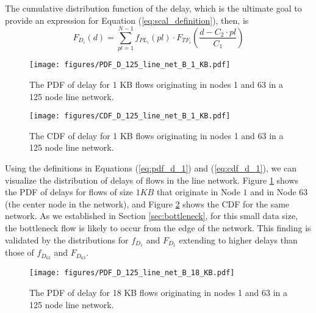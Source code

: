 The cumulative distribution function of the delay, which is the ultimate goal to provide an expression for Equation (\ref{eq:scal_definition}), then, is
\begin{equation}
	F_{D_i}(d) = \sum\limits_{pl=1}^{N-1} f_{PL_i}(pl) \cdot F_{TF_i}(\frac{d - C_2 \cdot pl}{C_1})
	\label{eq:cdf_d_1}
\end{equation}

\begin{figure}
\begin{centering}
    \texttt{[image: figures/PDF\_D\_125\_line\_net\_B\_1\_KB.pdf]}
    \caption{The PDF of delay for 1 KB flows originating in nodes 1 and 63 in a 125 node line network.}
    \label{fig:pdf_d_125_line_net_B_1_KB}
\end{centering}
\end{figure}

\begin{figure}
\begin{centering}
    \texttt{[image: figures/CDF\_D\_125\_line\_net\_B\_1\_KB.pdf]}
    \caption{The CDF of delay for 1 KB flows originating in nodes 1 and 63 in a 125 node line network.}
    \label{fig:cdf_d_125_line_net_B_1_KB}
\end{centering}
\end{figure}

Using the definitions in Equations (\ref{eq:pdf_d_1}) and (\ref{eq:cdf_d_1}), we can visualize the distribution of delays of flows in the line network.  Figure \ref{fig:pdf_d_125_line_net_B_1_KB} shows the PDF of delays for flows of size $1 KB$ that originate in Node $1$ and in Node $63$ (the center node in the network), and Figure \ref{fig:cdf_d_125_line_net_B_1_KB} shows the CDF for the same network.  As we established in Section \ref{sec:bottleneck}, for this small data size, the bottleneck flow is likely to occur from the edge of the network.  This finding is validated by the distributions for $f_{D_1}$ and $F_{D_1}$ extending to higher delays than those of $f_{D_{63}}$ and $F_{D_{63}}$.

\begin{figure}
\begin{centering}
    \texttt{[image: figures/PDF\_D\_125\_line\_net\_B\_18\_KB.pdf]}
    \caption{The PDF of delay for 18 KB flows originating in nodes 1 and 63 in a 125 node line network.}
    \label{fig:pdf_d_125_line_net_B_18_KB}
\end{centering}
\end{figure}

